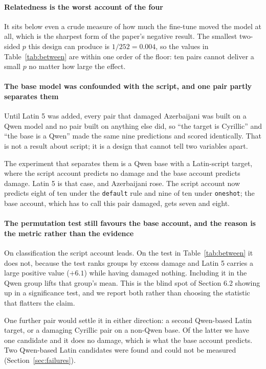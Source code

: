 \documentclass[final]{clv2025}
\begin{document}
\paragraph{Relatedness is the worst account of the four} It sits below even a
crude measure of how much the fine-tune moved the model at all, which is the
sharpest form of the paper's negative result. The smallest two-sided $p$ this
design can produce is $1/252 = 0.004$, so the values in
Table~\ref{tab:between} are within one order of the floor: ten pairs cannot
deliver a small $p$ no matter how large the effect.

\paragraph{The base model was confounded with the script, and one pair
partly separates them} Until Latin 5 was added, every pair that damaged
Azerbaijani was built on a Qwen model and no pair built on anything else did,
so ``the target is Cyrillic'' and ``the base is a Qwen'' made the same nine
predictions and scored identically. That is not a result about script; it is a
design that cannot tell two variables apart.

The experiment that separates them is a Qwen base with a Latin-script target,
where the script account predicts no damage and the base account predicts
damage. Latin 5 is that case, and Azerbaijani rose. The script account now
predicts eight of ten under the \texttt{default} rule and nine of ten under
\texttt{oneshot}; the base account, which has to call this pair damaged, gets
seven and eight.

\paragraph{The permutation test still favours the base account, and the reason
is the metric rather than the evidence} On classification the script account
leads. On the test in Table~\ref{tab:between} it does not, because the test
ranks groups by excess damage and Latin 5 carries a large positive value
($+6.1$) while having damaged nothing. Including it in the Qwen group lifts
that group's mean. This is the blind spot of Section 6.2 showing up in a
significance test, and we report both rather than choosing the statistic that
flatters the claim.

One further pair would settle it in either direction: a second Qwen-based Latin
target, or a damaging Cyrillic pair on a non-Qwen base. Of the latter we have
one candidate and it does no damage, which is what the base account predicts.
Two Qwen-based Latin candidates were found and could not be measured
(Section~\ref{sec:failures}).
\end{document}
